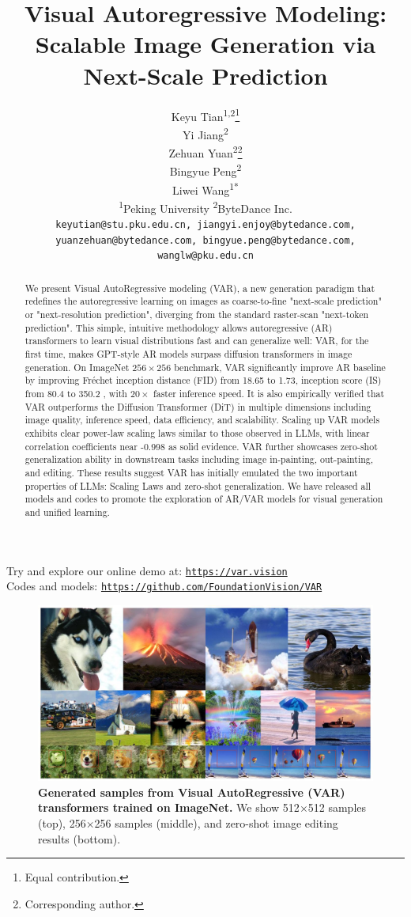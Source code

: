 \documentclass{article}
\title{Visual Autoregressive Modeling: Scalable Image Generation via Next-Scale Prediction }
\author{%
  Keyu Tian\textsuperscript{1,2}\thanks{Equal contribution.} \\
  \And
  Yi Jiang\textsuperscript{2}\textsuperscript{\dag} \\
  \And
  Zehuan Yuan\textsuperscript{2}\thanks{Corresponding author.} \\
  \And
  Bingyue Peng\textsuperscript{2} \\
  \And
  Liwei Wang\textsuperscript{1}\textsuperscript{*} \\
  \AND
  \textsuperscript{1}Peking University \qquad
  \textsuperscript{2}ByteDance Inc. \\
  \texttt{keyutian@stu.pku.edu.cn, jiangyi.enjoy@bytedance.com,} \\
  \texttt{yuanzehuan@bytedance.com, bingyue.peng@bytedance.com, wanglw@pku.edu.cn}
}
\begin{document}
\maketitle
\begin{center}
  Try and explore our online demo at:\;
  \href{https://var.vision}{\texttt{https://var.vision}} \\
  Codes and models:\;
  \href{https://github.com/FoundationVision/VAR}{\texttt{https://github.com/FoundationVision/VAR}}
\end{center}

\begin{figure}[h]
  \centering  \includegraphics[width=\linewidth]{2025_10_26_62f95e615e8879e267a8g-01(1).jpg}
\caption{\textbf{Generated samples from Visual AutoRegressive (VAR) transformers trained on ImageNet.}
  We show 512$\times$512 samples (top), 256$\times$256 samples (middle), and zero-shot image editing results (bottom).}
  \label{fig:teaser}
\end{figure}

\begin{abstract}
We present Visual AutoRegressive modeling (VAR), a new generation paradigm that redefines the autoregressive learning on images as coarse-to-fine "next-scale prediction" or "next-resolution prediction", diverging from the standard raster-scan "next-token prediction". This simple, intuitive methodology allows autoregressive (AR) transformers to learn visual distributions fast and can generalize well: VAR, for the first time, makes GPT-style AR models surpass diffusion transformers in image generation. On ImageNet $256 \times 256$ benchmark, VAR significantly improve AR baseline by improving Fréchet inception distance (FID) from 18.65 to 1.73, inception score (IS) from 80.4 to 350.2 , with $20 \times$ faster inference speed. It is also empirically verified that VAR outperforms the Diffusion Transformer (DiT) in multiple dimensions including image quality, inference speed, data efficiency, and scalability. Scaling up VAR models exhibits clear power-law scaling laws similar to those observed in LLMs, with linear correlation coefficients near -0.998 as solid evidence. VAR further showcases zero-shot generalization ability in downstream tasks including image in-painting, out-painting, and editing. These results suggest VAR has initially emulated the two important properties of LLMs: Scaling Laws and zero-shot generalization. We have released all models and codes to promote the exploration of AR/VAR models for visual generation and unified learning.
\end{abstract}
\end{document}
